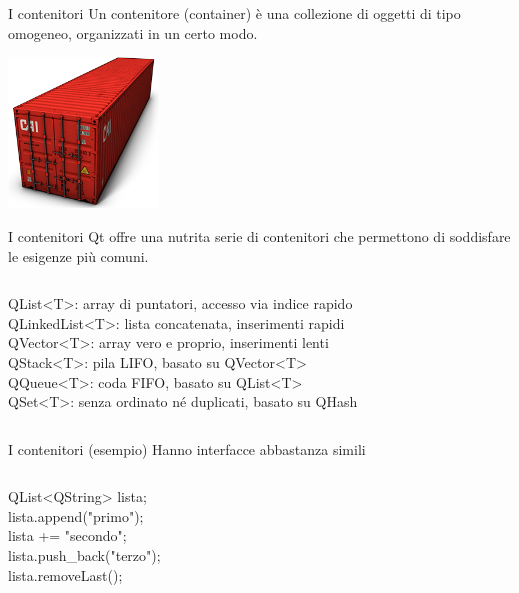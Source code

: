\documentclass[10pt, aspectratio=169]{beamer}
\begin{document}
\begin{frame}{I contenitori}
	Un contenitore (container) è una collezione di oggetti di tipo omogeneo, organizzati in un certo modo.
	
	\bigskip
	\begin{center}
		\includegraphics[height=4cm]{images/container.png}
	\end{center}
\end{frame}

\begin{frame}{I contenitori}
	Qt offre una nutrita serie di contenitori che permettono di soddisfare le esigenze più comuni.
	\bigskip
	\begin{columns}
		\begin{block}{}
			{\ttfamily QList<T>}: array di puntatori, accesso via indice rapido\\
			{\ttfamily QLinkedList<T>}: lista concatenata, inserimenti rapidi\\
			{\ttfamily QVector<T>}: array vero e proprio, inserimenti lenti\\
			{\ttfamily QStack<T>}: pila LIFO, basato su {\ttfamily QVector<T>}\\
			{\ttfamily QQueue<T>}: coda FIFO, basato su {\ttfamily QList<T>}\\
			{\ttfamily QSet<T>}: senza ordinato né duplicati, basato su {\ttfamily QHash}
		\end{block}
	\end{columns}
	\bigskip
\end{frame}

\begin{frame}{I contenitori (esempio)}
	Hanno interfacce abbastanza simili
	\bigskip
	\begin{columns}
		\column{0.5\textwidth}
		\begin{block}{}
			{\ttfamily QList<QString> lista;\\
				lista.append("primo");\\
				lista += "secondo";\\
				lista.push\_back("terzo");\\
				lista.removeLast();}
		\end{block}
	\end{columns}
	\bigskip
\end{frame}
\end{document}
